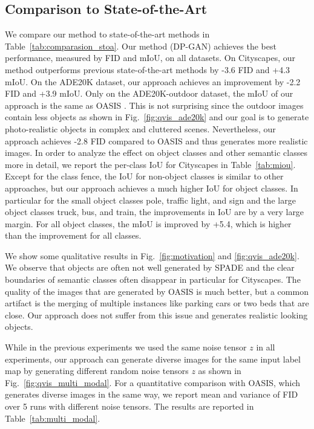\documentclass{bmvc2k}
\newcommand{\figref}[1]{Fig.~\ref{#1}}
\newcommand{\tabref}[1]{Table~\ref{#1}}
\begin{document}
\subsection{Comparison to State-of-the-Art}
We compare our method to state-of-the-art methods in \tabref{tab:comparasion_stoa}. Our method (DP-GAN) achieves the best performance, measured by FID and mIoU, on all datasets. On Cityscapes, our method outperforms previous state-of-the-art methods by -3.6 FID and +4.3 mIoU. On the ADE20K dataset, our approach achieves an improvement by -2.2 FID and +3.9 mIoU. Only on the ADE20K-outdoor dataset, the mIoU of our approach is the same as OASIS \cite{schonfeld_sushko_iclr2021}. This is not surprising since the outdoor images contain less objects as shown in \figref{fig:qvis_ade20k} and our goal is to generate photo-realistic objects in complex and cluttered scenes. Nevertheless, our approach achieves -2.8 FID compared to OASIS and thus generates more realistic images. In order to analyze the effect on object classes and other semantic classes more in detail, we report the per-class IoU for Cityscapes in \tabref{tab:miou}. Except for the class fence, the IoU for non-object classes is similar to other approaches, but our approach achieves a much higher IoU for object classes. In particular for the small object classes pole, traffic light, and sign and the large object classes truck, bus, and train, the improvements in IoU are by a very large margin. For all object classes, the mIoU is improved by +5.4, which is higher than the improvement for all classes. 












We show some qualitative results in \figref{fig:motivation} and \ref{fig:qvis_ade20k}. We observe that objects are often not well generated by SPADE and the clear boundaries of semantic classes often disappear in particular for Cityscapes. The quality of the images that are generated by OASIS is much better, but a common artifact is the merging of multiple instances like parking cars or two beds that are close. Our approach does not suffer from this issue and generates realistic looking objects. 

While in the previous experiments we used the same noise tensor $z$ in all experiments, our approach can generate diverse images for the same input label map by generating different random noise tensors $z$ as shown in \figref{fig:qvis_multi_modal}. For a quantitative comparison with OASIS, which generates diverse images in the same way, we report mean and variance of FID over 5 runs with different noise tensors. The results are reported in \tabref{tab:multi_modal}. 
\end{document}
